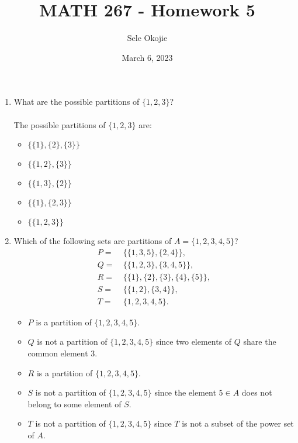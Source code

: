 \documentclass{article}
\title{MATH 267 - Homework 5}
\author{Sele Okojie}
\date{March 6, 2023}
\begin{document}
    \maketitle
    
    \begin{enumerate}

    	\item What are the possible partitions of $\{ 1, 2, 3 \}$? \\\\
                 The possible partitions of $\{ 1, 2, 3 \}$ are:
                \begin{itemize}
                     \item $\bigl\{ \{1\}, \{2\}, \{3\} \bigr\}$
                     \item $\bigl\{ \{1, 2\}, \{3\} \bigr\}$
                     \item $\bigl\{ \{1, 3\}, \{2\} \bigr\}$
                     \item $\bigl\{ \{1\}, \{2, 3\} \bigr\}$
                     \item $\bigl\{ \{1, 2, 3\} \bigr\}$
                 \end{itemize}

    	\item Which of the following sets are partitions of $A = \{1, 2, 3, 4, 5 \}$?
    	    \begin{align*}
    			P = & \ \{ \{ 1, 3, 5 \}, \{ 2, 4 \} \}, \\
    			Q = & \ \{ \{ 1, 2, 3 \}, \{ 3, 4, 5 \} \}, \\
    			R = & \ \{ \{ 1 \}, \{ 2 \}, \{ 3 \}, \{ 4 \}, \{ 5 \} \}, \\
    			S = & \ \{ \{ 1, 2 \}, \{ 3, 4 \} \}, \\
    			T = & \ \{ 1, 2, 3, 4, 5 \}.
    	    \end{align*}
                \begin{itemize}
                    \item $P$ is a partition of $\{1, 2, 3, 4, 5 \}$.
                    \item $Q$ is not a partition of $\{1, 2, 3, 4, 5 \}$ since two elements of $Q$ share the common element $3$.
                    \item $R$ is a partition of $\{1, 2, 3, 4, 5 \}$.
                    \item $S$ is not a partition of $\{1, 2, 3, 4, 5 \}$ since the element $5 \in A$ does not belong to some element of $S$.
                    \item $T$ is not a partition of $\{1, 2, 3, 4, 5 \}$ since $T$ is not a subset of the power set of $A$.
                \end{itemize}
                

\end{enumerate}
\end{document}
